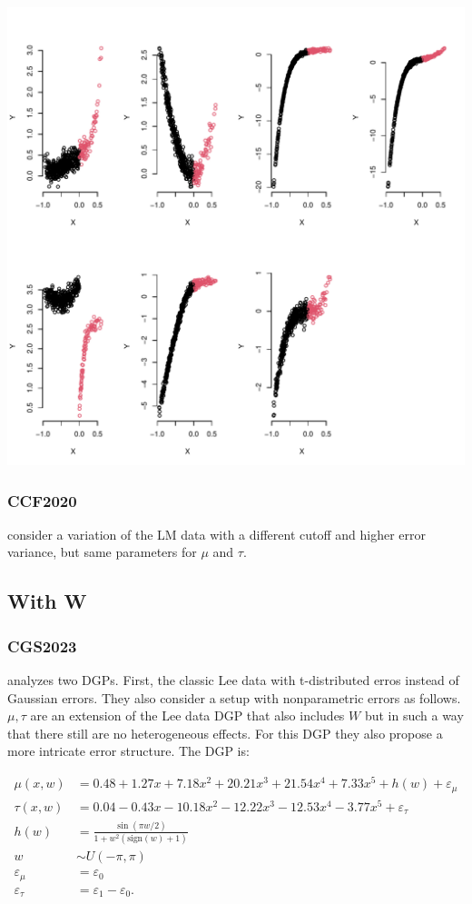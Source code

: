 \documentclass[11pt]{article}
\begin{document}
\begin{center}
\includegraphics[width=.9\linewidth]{BRBM2019.pdf}
\end{center}

\subsubsection{CCF2020}
\label{sec:org73056eb}
\cite{calonico2020optimal} consider a variation of the LM data
with a different cutoff and higher error variance, but same
parameters for \(\mu\) and \(\tau\).
\subsection{With W}
\label{sec:org349a438}
\subsubsection{CGS2023}
\label{sec:org6729e1e}
\cite{chib2023nonparametric} analyzes two DGPs. First, the
classic Lee data with t-distributed erros instead of
Gaussian errors. They also consider a setup with
nonparametric errors as follows. \(\mu,\tau\) are an extension
of the Lee data DGP that also includes \(W\) but in such a way
that there still are no heterogeneous effects. For this DGP
they also propose a more intricate error structure. The DGP
is:

\begin{equation}
  \begin{split}
    \mu(x,w) &= 0.48 + 1.27 x + 7.18 x^2 + 20.21 x^3 + 21.54 x^4 + 7.33 x^5 + h(w) + \varepsilon_{\mu}\\
    \tau(x,w) &= 0.04 - 0.43 x - 10.18 x^2 - 12.22 x^3 - 12.53 x^4 - 3.77 x^5 + \varepsilon_{\tau}\\
    h(w) &= \frac{\sin(\pi w/2)}{1 + w^2(\text{sign}(w)+1)}\\
    w &\sim U(-\pi,\pi)\\
    \varepsilon_{\mu} &= \varepsilon_0\\
    \varepsilon_{\tau} &= \varepsilon_1 - \varepsilon_0.
  \end{split}
\end{equation}
\end{document}
